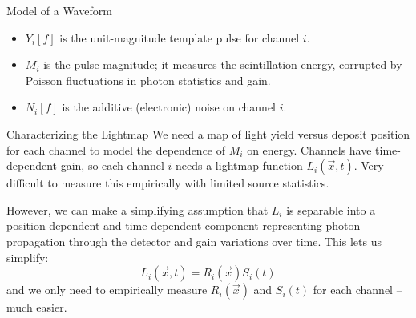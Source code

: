 \documentclass[final]{beamer} %
\begin{document}
\begin{frame}{}
\begin{columns}[t]
\begin{column}{.3\linewidth}
\begin{block}{\large Model of a Waveform}
\begin{itemize}
\item $Y_i[f]$ is the unit-magnitude template pulse for channel $i$.
\item $M_i$ is the pulse magnitude; it measures the scintillation energy, corrupted by Poisson fluctuations in photon statistics and gain.
\item $N_i[f]$ is the additive (electronic) noise on channel $i$.
\end{itemize}
    \end{block}

    \begin{block}{\large Characterizing the Lightmap}
We need a map of light yield versus deposit position for each channel to model the dependence of $M_i$ on energy.  Channels have time-dependent gain, so each channel $i$ needs a lightmap function $L_i(\vec{x}, t)$.  Very difficult to measure this empirically with limited source statistics.

However, we can make a simplifying assumption that $L_i$ is separable into a position-dependent and time-dependent component representing photon propagation through the detector and gain variations over time.  This lets us simplify:
\[L_i(\vec{x}, t) = R_i(\vec{x})S_i(t)\]
and we only need to empirically measure $R_i(\vec{x})$ and $S_i(t)$ for each channel -- much easier.


\end{block}
\end{column}
\end{columns}
\end{frame}
\end{document}
